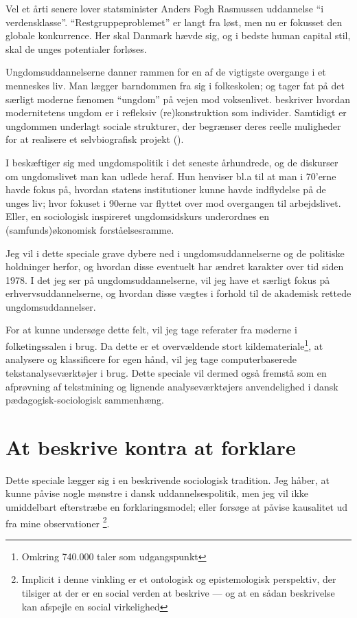  Vel et årti senere lover statsminister Anders Fogh Rasmussen uddannelse “i verdensklasse”. “Restgruppeproblemet” er langt fra løst, men nu er fokusset den globale konkurrence.
 Her skal Danmark hævde sig, og i bedste human capital stil, skal de unges potentialer forløses.

 Ungdomsuddannelserne danner rammen for en af de vigtigste overgange i et menneskes liv.
 Man lægger barndommen fra sig i folkeskolen; og tager fat på det særligt moderne fænomen “ungdom” på vejen mod voksenlivet.
 \citeauthor{juulDiskurserOmUngdom2013} beskriver hvordan modernitetens ungdom er i refleksiv (re)konstruktion som individer.
 Samtidigt er ungdommen underlagt sociale strukturer, der begrænser deres reelle muligheder for at realisere et selvbiografisk projekt (\citeyear[s. 11]{juulDiskurserOmUngdom2013}).

I  beskæftiger \citeauthor{juulDiskurserOmUngdom2013} sig med ungdomspolitik i det seneste århundrede, og de diskurser om ungdomslivet man kan udlede heraf.
Hun henviser bl.a til at man i 70'erne havde fokus på, hvordan statens institutioner kunne havde indflydelse på de unges liv; hvor fokuset i 90erne var flyttet over mod overgangen til arbejdslivet.
Eller, en sociologisk inspireret ungdomsidskurs underordnes en (samfunds)økonomisk forståelsesramme.

Jeg vil i dette speciale grave dybere ned i ungdomsuddannelserne og de politiske holdninger herfor, og hvordan disse eventuelt har ændret karakter over tid siden 1978.
I det jeg ser på ungdomsuddannelserne, vil jeg have et særligt fokus på erhvervsuddannelserne, og hvordan disse vægtes i forhold til de akademisk rettede ungdomsuddannelser.

For at kunne undersøge dette felt, vil jeg tage referater fra møderne i folketingssalen i brug.
Da dette er et overvældende stort kildemateriale\footnote{Omkring 740.000 taler som udgangspunkt}, at analysere og klassificere for egen hånd, vil jeg tage computerbaserede tekstanalyseværktøjer i brug.
Dette speciale vil dermed også fremstå som en afprøvning af tekstmining og lignende analyseværktøjers anvendelighed i dansk pædagogisk-sociologisk sammenhæng.

\section{At beskrive kontra at forklare}\label{sec:beskrive}

Dette speciale lægger sig i en beskrivende sociologisk tradition.
Jeg håber, at kunne påvise nogle mønstre i dansk uddannelsespolitik,
men jeg vil ikke umiddelbart efterstræbe en forklaringsmodel;
eller forsøge at påvise kausalitet ud fra mine observationer
\footnote{Implicit i denne vinkling er et ontologisk og epistemologisk perspektiv,
der tilsiger at der er en social verden at beskrive —
og at en sådan beskrivelse kan afspejle en social virkelighed}.

